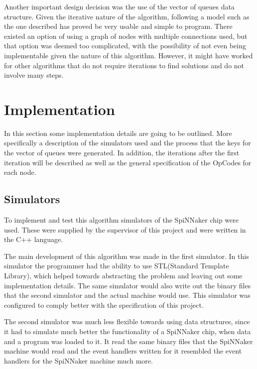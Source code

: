 \documentclass[12pt,twosided]{article}
\begin{document}
Another important design decision was the use of the vector of queues data structure. Given the iterative nature of the algorithm, following a model such as the one described has proved be very usable and simple to program. There existed an option of using a graph of nodes with multiple connections used, but that option was deemed too complicated, with the possibility of not even being implementable given the nature of this algorithm. However, it might have worked for other algorithms that do not require iterations to find solutions and do not involve many steps.
\section{Implementation}
In this section some implementation details are going to be outlined. More specifically a description of the simulators used and the process that the keys for the vector of queues were generated. In addition, the iterations after the first iteration will be described as well as the general specification of the OpCodes for each node.
\subsection{Simulators}
To implement and test this algorithm simulators of the SpiNNaker chip were used. These were supplied by the supervisor of this project and were written in the C++ language. 

The main development of this algorithm was made in the first simulator. In this simulator the programmer had the ability to use STL(Standard Template Library), which helped towards abstracting the problem and leaving out some implementation details. The same simulator would also write out the binary files that the second simulator and the actual machine would use. This simulator was configured to comply better with the specification of this project.

The second simulator was much less flexible towards using data structures, since it had to simulate much better the functionality of a SpiNNaker chip, when data and a program was loaded to it. It read the same binary files that the SpiNNaker machine would read and the event handlers written for it resembled the event handlers for the SpiNNaker machine much more.
\end{document}
